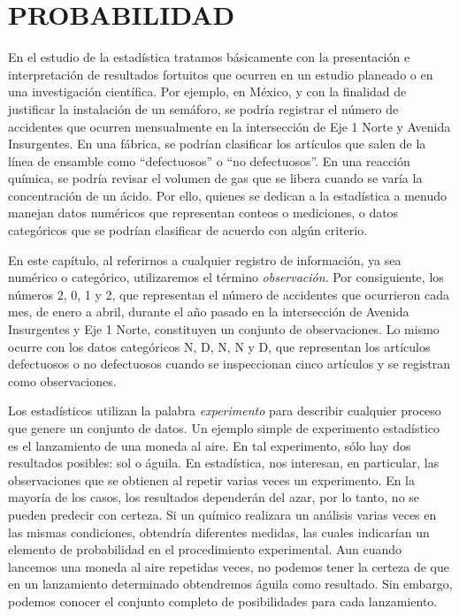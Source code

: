 \chapter{PROBABILIDAD}
\printchaptertableofcontents

En el estudio de la estadística tratamos básicamente con la presentación e interpretación de resultados fortuitos que ocurren en un estudio planeado o en una investigación científica. Por ejemplo, en México, y con la finalidad de justificar la instalación de un semáforo, se podría registrar el número de accidentes que ocurren mensualmente en la intersección de Eje 1 Norte y Avenida Insurgentes. En una fábrica, se podrían clasificar los artículos que salen de la línea de ensamble como “defectuosos” o “no defectuosos”. En una reacción química, se podría revisar el volumen de gas que se libera cuando se varía la concentración de un ácido. Por ello, quienes se dedican a la estadística a menudo manejan datos numéricos que representan conteos o mediciones, o datos categóricos que se podrían clasificar de acuerdo con algún criterio.

En este capítulo, al referirnos a cualquier registro de información, ya sea numérico o categórico, utilizaremos el término \emph{observación}. Por consiguiente, los números 2, 0, 1 y 2, que representan el número de accidentes que ocurrieron cada mes, de enero a abril, durante el año pasado en la intersección de Avenida Insurgentes y Eje 1 Norte, constituyen un conjunto de observaciones. Lo mismo ocurre con los datos categóricos N, D, N, N y D, que representan los artículos defectuosos o no defectuosos cuando se inspeccionan cinco artículos y se registran como observaciones.

Los estadísticos utilizan la palabra \emph{experimento} para describir cualquier proceso que genere un conjunto de datos. Un ejemplo simple de experimento estadístico es el lanzamiento de una moneda al aire. En tal experimento, sólo hay dos resultados posibles: sol o águila. En estadística, nos interesan, en particular, las observaciones que se obtienen al repetir varias veces un experimento. En la mayoría de los casos, los resultados dependerán del azar, por lo tanto, no se pueden predecir con certeza. Si un químico realizara un análisis varias veces en las mismas condiciones, obtendría diferentes medidas, las cuales indicarían un elemento de probabilidad en el procedimiento experimental. Aun cuando lancemos una moneda al aire repetidas veces, no podemos tener la certeza de que en un lanzamiento determinado obtendremos águila como resultado. Sin embargo, podemos conocer el conjunto completo de posibilidades para cada lanzamiento.

